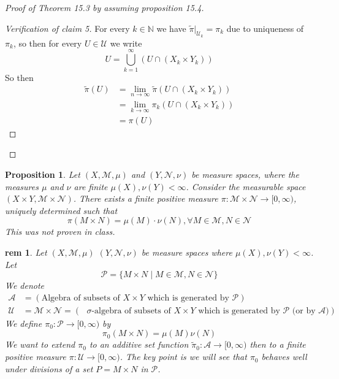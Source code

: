 \documentclass[letterpaper, 12pt]{article}
\newcommand{\fin}{\qquad \quad \hfill \framebox[1.75mm][l]{\,}}
\newcommand{\cU}{\mathcal{U}}
\newcommand{\cM}{\mathcal{M}}
\newcommand{\cN}{\mathcal{N}}
\newcommand{\bN}{\mathbb{N}}
\newcommand{\cP}{\mathcal{P}}
\newcommand{\sA}{\mathcal{A}}
\theoremstyle{stdthm}
\newtheorem{prop}[thm]{Proposition}
\theoremstyle{stddef}
\newtheorem{rem}[thm]{rem} %
\theoremstyle{stdnonum}
\theoremstyle{stdqands}
\theoremstyle{stdbold}
\begin{document}
\begin{proof} [ Proof of Theorem 15.3 by assuming proposition 15.4]
\begin{proof}[Verification of claim 5]
For every $k\in \bN$ we have $\tilde{\pi}|_{\cU_k} = \pi_k$ due to uniqueness of $\pi_k$, so then for every $U \in \cU$ we write 
\[ U = \bigcup_{k=1}^\infty (U \cap (X_k \times Y_k)) \]
So then 
\begin{align*}
\tilde{\pi}(U) &= \lim_{n\rightarrow \infty} \tilde{\pi} (U \cap (X_k \times Y_k)) \tag{CAIC}\\
&= \lim_{k\rightarrow \infty} \pi_k (U \cap (X_k \times Y_k))\\
&= \pi(U)
\end{align*}

\end{proof}

\end{proof}

\begin{prop}
Let $(X,\cM,\mu)$ and $(Y,\cN,\nu)$ be measure spaces, where the measures $\mu$ and $\nu$ are finite $\mu(X), \nu(Y) < \infty$. Consider the measurable space $(X \times Y, \cM \times \cN)$. There exists a finite positive measure $\pi:\cM \times \cN \to [0,\infty)$, uniquely determined such that 
\[ \pi(M\times N) = \mu(M) \cdot \nu(N), \forall M \in \cM, N \in \cN \]
 This was not proven in class. 
\end{prop}

\begin{rem}
Let $(X,\cM, \mu)$ $(Y,\cN, \nu)$ be measure spaces where $\mu(X),\nu(Y) < \infty$.  Let 
\[ \cP = \{ M \times N \mid M \in \cM , N \in \cN \} \]
We denote 
\begin{align*}
\sA &= (\text{Algebra of subsets of $X \times Y$ which is generated by $\cP$})\\
\cU &= \cM \times \cN = (\text{ $\sigma$-algebra of subsets of $X \times Y$ which is generated by $\cP$ (or by $\sA$)})
\end{align*}
We define $\pi_0: \cP \to [0,\infty)$  by 
\[ \pi_0(M \times N) = \mu(M) \nu(N) \]
We want to extend $\pi_0$ to an additive set function $\tilde{\pi}_0:\sA \to [0,\infty)$ then to a finite positive measure $\pi: \cU \to [0,\infty)$. The key point is we will see that $\pi_0$ behaves well under divisions of a set $P = M \times N$ in $\cP$. 
\end{rem}
\end{document}
